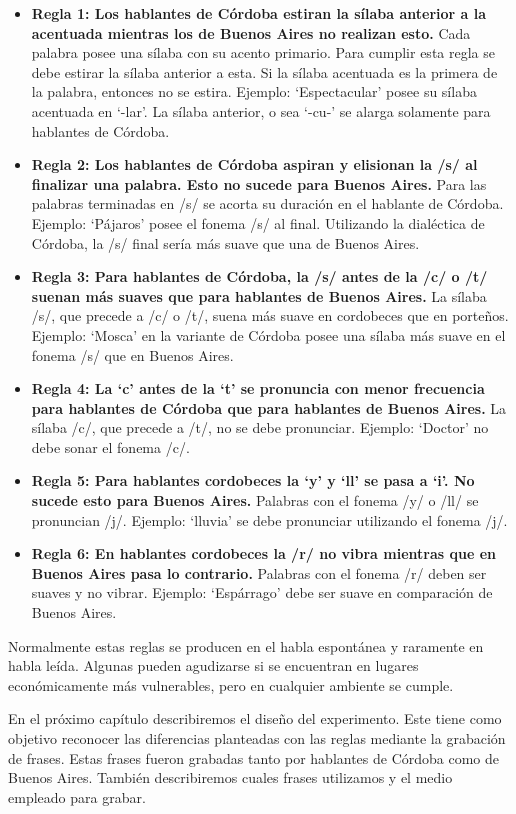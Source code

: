 \begin{itemize}

\item \textbf{Regla 1: Los hablantes de Córdoba estiran la sílaba anterior a la acentuada mientras los de Buenos Aires no realizan esto.} Cada palabra posee una sílaba con su acento primario. Para cumplir esta regla se debe estirar la sílaba anterior a esta. Si la sílaba acentuada es la primera de la palabra, entonces no se estira. Ejemplo: `Espectacular' posee su sílaba acentuada en `-lar'. La sílaba anterior, o sea `-cu-' se alarga solamente para hablantes de Córdoba. 

\item \textbf{Regla 2: Los hablantes de Córdoba aspiran y elisionan la /s/ al finalizar una palabra. Esto no sucede para Buenos Aires.} Para las palabras terminadas en /s/ se acorta su duración en el hablante de Córdoba. Ejemplo: `Pájaros' posee el fonema /s/ al final. Utilizando la dialéctica de Córdoba, la /s/ final sería más suave que una de Buenos Aires. 

\item \textbf{Regla 3: Para hablantes de Córdoba, la /s/ antes de la /c/ o /t/ suenan más suaves que para hablantes de Buenos Aires.} La sílaba /s/, que precede a /c/ o /t/, suena más suave en cordobeces que en porteños. Ejemplo: `Mosca' en la variante de Córdoba posee una sílaba más suave en el fonema /s/ que en Buenos Aires. 

\item \textbf{Regla 4: La `c' antes de la `t' se pronuncia con menor frecuencia para hablantes de Córdoba que para hablantes de Buenos Aires.} La sílaba /c/, que precede a /t/, no se debe pronunciar. Ejemplo: `Doctor' no debe sonar el fonema /c/.

\item \textbf{Regla 5: Para hablantes cordobeces la `y’ y `ll’ se pasa a `i’. No sucede esto para Buenos Aires.} Palabras con el fonema /y/ o /ll/ se pronuncian /j/. Ejemplo: `lluvia' se debe pronunciar utilizando el fonema /j/. 

\item \textbf{Regla 6: En hablantes cordobeces la /r/ no vibra mientras que en Buenos Aires pasa lo contrario.} Palabras con el fonema /r/ deben ser suaves y no vibrar. Ejemplo: `Espárrago' debe ser suave en comparación de Buenos Aires. 

\end{itemize}

Normalmente estas reglas se producen en el habla espontánea y raramente en habla leída. Algunas pueden agudizarse si se encuentran en lugares económicamente más vulnerables, pero en cualquier ambiente se cumple.

En el próximo capítulo describiremos el diseño del experimento. Este tiene como objetivo reconocer las diferencias planteadas con las reglas mediante la grabación de frases. Estas frases fueron grabadas tanto por hablantes de Córdoba como de Buenos Aires. También describiremos cuales frases utilizamos y el medio empleado para grabar.

